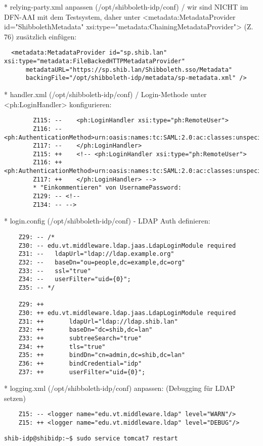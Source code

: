 * relying-party.xml anpassen (/opt/shibboleth-idp/conf) / wir sind NICHT im
DFN-AAI mit dem Testsystem, daher unter <metadata:MetadataProvider
id="ShibbolethMetadata" xsi:type="metadata:ChainingMetadataProvider"> (Z. 76) zusätzlich einfügen:
\begin{lstlisting}	
  <metadata:MetadataProvider id="sp.shib.lan" xsi:type="metadata:FileBackedHTTPMetadataProvider"
      metadataURL="https://sp.shib.lan/Shibboleth.sso/Metadata"
      backingFile="/opt/shibboleth-idp/metadata/sp-metadata.xml" />
\end{lstlisting}
* handler.xml (/opt/shibboleth-idp/conf) / Login-Methode unter <ph:LoginHandler>
konfigurieren:
\begin{lstlisting}
		Z115: --    <ph:LoginHandler xsi:type="ph:RemoteUser">
		Z116: --		<ph:AuthenticationMethod>urn:oasis:names:tc:SAML:2.0:ac:classes:unspecified</ph:AuthenticationMethod>
		Z117: --	</ph:LoginHandler>
		Z115: ++    <!-- <ph:LoginHandler xsi:type="ph:RemoteUser">
		Z116: ++		<ph:AuthenticationMethod>urn:oasis:names:tc:SAML:2.0:ac:classes:unspecified</ph:AuthenticationMethod>
		Z117: ++	</ph:LoginHandler> -->
		* "Einkommentieren" von UsernamePassword:
		Z129: -- <!-- 
		Z134: -- -->
\end{lstlisting}
* login.config (/opt/shibboleth-idp/conf) - LDAP Auth definieren:
\begin{lstlisting}
	Z29: -- /*
	Z30: --	edu.vt.middleware.ldap.jaas.LdapLoginModule required
	Z31: --	  ldapUrl="ldap://ldap.example.org"
	Z32: --	  baseDn="ou=people,dc=example,dc=org"
	Z33: --	  ssl="true"
	Z34: --	  userFilter="uid={0}";
	Z35: --	*/
	
	Z29: ++ 
	Z30: ++ edu.vt.middleware.ldap.jaas.LdapLoginModule required
	Z31: ++ 	  ldapUrl="ldap://ldap.shib.lan"
	Z32: ++ 	  baseDn="dc=shib,dc=lan"
	Z33: ++	      subtreeSearch="true"
	Z34: ++ 	  tls="true"
	Z35: ++ 	  bindDn="cn=admin,dc=shib,dc=lan"
	Z36: ++ 	  bindCredential="idp"
	Z37: ++ 	  userFilter="uid={0}";
\end{lstlisting}
* logging.xml (/opt/shibboleth-idp/conf) anpassen: (Debugging für LDAP setzen)
\begin{lstlisting}
	Z15: -- <logger name="edu.vt.middleware.ldap" level="WARN"/>
	Z15: ++ <logger name="edu.vt.middleware.ldap" level="DEBUG"/>
\end{lstlisting}
\begin{lstlisting}
shib-idp@shibidp:~$ sudo service tomcat7 restart
\end{lstlisting}


